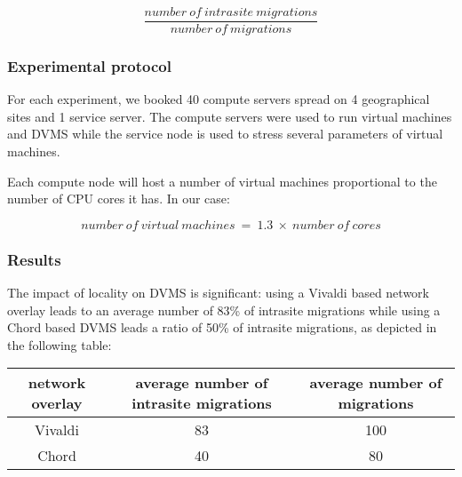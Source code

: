 \[
	\frac{number\ of\ intrasite\ migrations}{number\ of\ migrations}
\]

\subsubsection{Experimental protocol}
For each experiment, we booked 40 compute servers spread on 4 geographical sites
and 1 service server. The compute servers were used to run virtual machines and
DVMS while the service node is used to stress several parameters of 
virtual machines.

Each compute node will host a number of virtual machines proportional to the 
number of CPU cores it has. In our case:

\[
	number\ of\ virtual\ machines\ =\ 1.3\ \times\ number\ of\ cores
\]

\subsubsection{Results}

The impact of locality on DVMS is significant: using a Vivaldi based network
overlay leads to an average number of 83\% of intrasite migrations while using 
a Chord based DVMS leads a ratio of 50\% of intrasite migrations, as depicted
in the following table:


\begin{tabular}{|c|c|c|}
  
  \hline
  network overlay & \multicolumn{1}{|p{3cm}|}{\centering average number of intrasite migrations}  & \multicolumn{1}{|p{3cm}|}{ \centering average number of migrations}  \\

  \hline
  Vivaldi & 83 & 100 \\

  \hline
  Chord & 40 & 80 \\

  \hline
\end{tabular}

